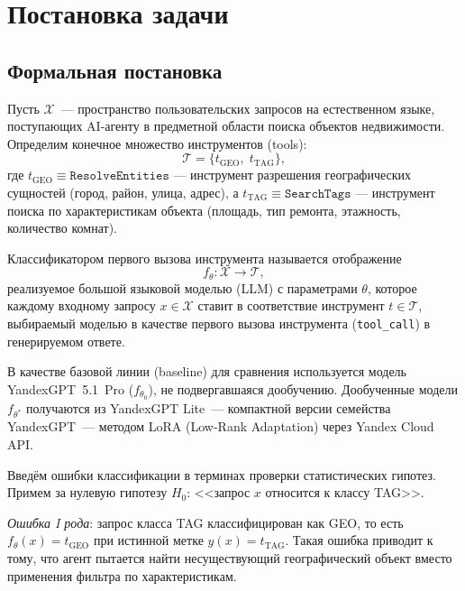 
\section{Постановка задачи} \label{sec:task}

\subsection{Формальная постановка}

Пусть $\mathcal{X}$~--- пространство пользовательских запросов на естественном языке, поступающих AI-агенту в предметной области поиска объектов недвижимости. Определим конечное множество инструментов (tools):
\[
    \mathcal{T} = \{t_{\mathrm{GEO}},\; t_{\mathrm{TAG}}\},
\]
где $t_{\mathrm{GEO}} \equiv \texttt{ResolveEntities}$ --- инструмент разрешения географических сущностей (город, район, улица, адрес), а $t_{\mathrm{TAG}} \equiv \texttt{SearchTags}$ --- инструмент поиска по характеристикам объекта (площадь, тип ремонта, этажность, количество комнат).

\begin{definition}
Классификатором первого вызова инструмента называется отображение
\[
    f_\theta \colon \mathcal{X} \to \mathcal{T},
\]
реализуемое большой языковой моделью (LLM) с параметрами $\theta$, которое каждому входному запросу $x \in \mathcal{X}$ ставит в соответствие инструмент $t \in \mathcal{T}$, выбираемый моделью в качестве первого вызова инструмента (\texttt{tool\_call}) в генерируемом ответе.
\end{definition}

В качестве базовой линии (baseline) для сравнения используется модель YandexGPT~5.1~Pro ($f_{\theta_0}$), не подвергавшаяся дообучению. Дообученные модели $f_{\theta^*}$ получаются из YandexGPT Lite~--- компактной версии семейства YandexGPT~--- методом LoRA (Low-Rank Adaptation) через Yandex Cloud API.

Введём ошибки классификации в терминах проверки статистических гипотез. Примем за нулевую гипотезу $H_0$: <<запрос $x$ относится к классу TAG>>.

\begin{definition}
\emph{Ошибка I рода}: запрос класса TAG классифицирован как GEO, то есть $f_\theta(x) = t_{\mathrm{GEO}}$ при истинной метке $y(x) = t_{\mathrm{TAG}}$. Такая ошибка приводит к тому, что агент пытается найти несуществующий географический объект вместо применения фильтра по характеристикам.
\end{definition}

